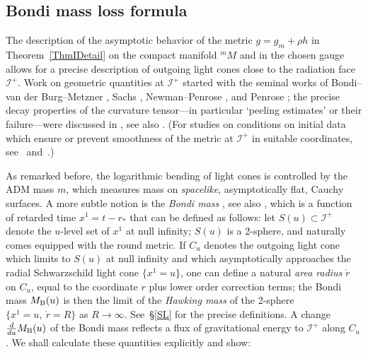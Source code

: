 \documentclass[reqno,11pt,letterpaper]{amsart}
\numberwithin{equation}{section}
\numberwithin{figure}{section}
\theoremstyle{definition}
\theoremstyle{remark}
\newcommand{\ms}{\mathscr}
\newcommand{\scri}{\ms I}
\begin{document}
\subsection{Bondi mass loss formula}
\label{SsIBondi}

The description of the asymptotic behavior of the metric $g=g_m+\rho h$ in Theorem~\ref{ThmIDetail} on the compact manifold ${}^m\!M$ and in the chosen gauge allows for a precise description of outgoing light cones close to the radiation face $\scri^+$. Work on geometric quantities at $\scri^+$ started with the seminal works of Bondi--van der Burg--Metzner \cite{BondiGravity,BondivdBMetznerGravity}, Sachs \cite{SachsGravity,SachsAsymptoticSymm}, Newman--Penrose \cite{NewmanPenroseSpin}, and Penrose \cite{PenroseAsymptotics}; the precise decay properties of the curvature tensor---in particular `peeling estimates' or their failure---were discussed in \cite{KlainermanNicoloPeeling,ChristodoulouNoPeeling}, see also \cite{DafermosChristodoulouExpose}. (For studies on conditions on initial data which ensure or prevent smoothness of the metric at $\scri^+$ in suitable coordinates, see~\cite{FriedrichConformalFE,FriedrichHyperbolicityEinstein,ChruscielMacCallumSingletonPhg,AnderssonChruscielHypPhg,ValienteKroonNonsmooth} and~\cite[\S8.2]{KlainermanNicoloEvolution}.)

As remarked before, the logarithmic bending of light cones is controlled by the ADM mass $m$, which measures mass on \emph{spacelike}, asymptotically flat, Cauchy surfaces. A more subtle notion is the \emph{Bondi mass} \cite{BondivdBMetznerGravity}, see also \cite{ChristodoulouNonlinear}, which is a function of retarded time $x^1=t-r_*$ that can be defined as follows: let $S(u)\subset\scri^+$ denote the $u$-level set of $x^1$ at null infinity; $S(u)$ is a 2-sphere, and naturally comes equipped with the round metric. If $C_u$ denotes the outgoing light cone which limits to $S(u)$ at null infinity and which asymptotically approaches the radial Schwarzschild light cone $\{x^1=u\}$, one can define a natural \emph{area radius} $\mathring r$ on $C_u$, equal to the coordinate $r$ plus lower order correction terms; the Bondi mass $M_{\rm B}(u)$ is then the limit of the \emph{Hawking mass} of the 2-sphere $\{x^1=u,\ \mathring r=R\}$ as $R\to\infty$. See~\S\ref{SL} for the precise definitions. A change $\frac{d}{d u}M_{\rm B}(u)$ of the Bondi mass reflects a flux of gravitational energy to $\scri^+$ along $C_u$. We shall calculate these quantities explicitly and show:
\end{document}
